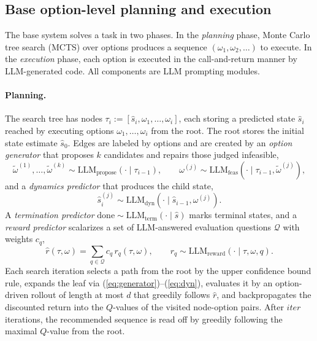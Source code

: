\documentclass[11pt]{article}
\newcommand{\llm}[1]{\mathrm{LLM}_{\mathrm{#1}}}
\newcommand{\calQ}{\mathcal{Q}}
\newcommand{\shat}{\hat{s}}
\begin{document}
\subsection{Base option-level planning and execution}
\label{sec:base}

The base system solves a task in two phases. In the \emph{planning} phase, Monte Carlo tree search (MCTS) over options produces a sequence $(\omega_1,\omega_2,\dots)$ to execute. In the \emph{execution} phase, each option is executed in the call-and-return manner by LLM-generated code. All components are LLM prompting modules.

\paragraph{Planning.}
The search tree has nodes $\tau_i:=[\shat_i,\omega_1,\dots,\omega_i]$, each storing a predicted state $\shat_i$ reached by executing options $\omega_1,\dots,\omega_i$ from the root. The root stores the initial state estimate $\shat_0$. Edges are labeled by options and are created by an \emph{option generator} that proposes $k$ candidates and repairs those judged infeasible,
\begin{equation}
\tilde\omega^{(1)},\dots,\tilde\omega^{(k)}\sim \llm{propose}(\cdot\mid\tau_{i-1}),\qquad
\omega^{(j)}\sim\llm{feas}(\cdot\mid\tau_{i-1},\tilde\omega^{(j)}),
\label{eq:generator}
\end{equation}
and a \emph{dynamics predictor} that produces the child state,
\begin{equation}
\shat^{(j)}_i\sim\llm{dyn}(\cdot\mid\shat_{i-1},\omega^{(j)}).
\label{eq:dyn}
\end{equation}
A \emph{termination predictor} $\mathrm{done}\sim\llm{term}(\cdot\mid\shat)$ marks terminal states, and a \emph{reward predictor} scalarizes a set of LLM-answered evaluation questions $\calQ$ with weights $c_q$,
\begin{equation}
\hat r(\tau,\omega)=\textstyle\sum_{q\in\calQ}c_q\,r_q(\tau,\omega),\qquad r_q\sim\llm{reward}(\cdot\mid\tau,\omega,q).
\label{eq:reward}
\end{equation}
Each search iteration selects a path from the root by the upper confidence bound rule, expands the leaf via (\ref{eq:generator})--(\ref{eq:dyn}), evaluates it by an option-driven rollout of length at most $d$ that greedily follows $\hat r$, and backpropagates the discounted return into the $Q$-values of the visited node-option pairs. After $\mathit{iter}$ iterations, the recommended sequence is read off by greedily following the maximal $Q$-value from the root.
\end{document}
